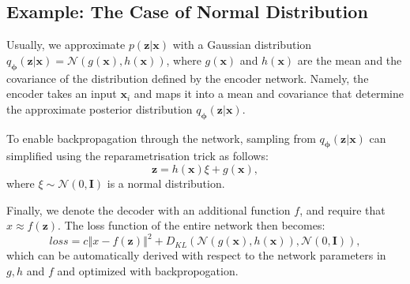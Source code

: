 \documentclass[graybox]{svmult}
\newcommand{\norm}[1]{\left\Vert#1\right\Vert}
\newcommand{\mb}[1]{\mathbf{#1}}
\newcommand{\bx}[0]{\mb{x}}
\newcommand{\bz}[0]{\mb{z}}
\newcommand{\bI}[0]{\mb{I}}
\newcommand{\bphi}[0]{\mb{\phi}}
\begin{document}
\subsection{Example: The Case of Normal Distribution}
Usually, we approximate $p(\bz|\bx)$ with a Gaussian distribution $q_\bphi (\bz|\bx)=\mathcal{N}(g(\bx),h(\bx))$, where $g(\bx)$ and $h(\bx)$ are the mean and the covariance of the distribution defined by the encoder network. Namely, the encoder takes an input $\bx_i$ and maps it into a mean and covariance that determine the approximate posterior distribution $q_\bphi (\bz|\bx)$. 

To enable backpropagation through the network, sampling from $q_\bphi (\bz|\bx)$ can simplified using the reparametrisation trick as follows:
\begin{equation}
\bz = h(\bx)\xi + g(\bx), 
\end{equation}
where $\xi \sim \mathcal{N}(0,\bI)$ is a normal distribution. 

Finally, we denote the decoder with an additional function $f$, and require that $x \approx f(\bz)$. The loss function of the entire network then becomes:
\begin{equation}
    loss = c \norm{x-f(\bz)}^2+ D_{KL}\left(\mathcal{N}(g(\bx), h(\bx)), \mathcal{N}(0,\bI) \right),
\end{equation}
which can be automatically derived with respect to the network parameters in $g,h$ and $f$ and optimized with backpropogation.



\end{document}
